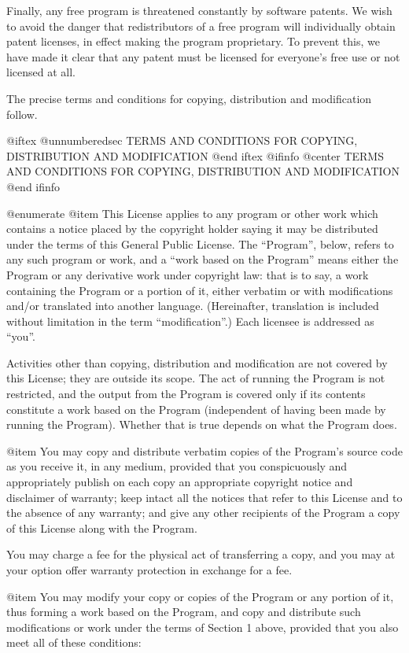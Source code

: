   Finally, any free program is threatened constantly by software
patents.  We wish to avoid the danger that redistributors of a free
program will individually obtain patent licenses, in effect making the
program proprietary.  To prevent this, we have made it clear that any
patent must be licensed for everyone's free use or not licensed at all.

  The precise terms and conditions for copying, distribution and
modification follow.

@iftex
@unnumberedsec TERMS AND CONDITIONS FOR COPYING, DISTRIBUTION AND MODIFICATION
@end iftex
@ifinfo
@center TERMS AND CONDITIONS FOR COPYING, DISTRIBUTION AND MODIFICATION
@end ifinfo

@enumerate
@item
This License applies to any program or other work which contains
a notice placed by the copyright holder saying it may be distributed
under the terms of this General Public License.  The ``Program'', below,
refers to any such program or work, and a ``work based on the Program''
means either the Program or any derivative work under copyright law:
that is to say, a work containing the Program or a portion of it,
either verbatim or with modifications and/or translated into another
language.  (Hereinafter, translation is included without limitation in
the term ``modification''.)  Each licensee is addressed as ``you''.

Activities other than copying, distribution and modification are not
covered by this License; they are outside its scope.  The act of
running the Program is not restricted, and the output from the Program
is covered only if its contents constitute a work based on the
Program (independent of having been made by running the Program).
Whether that is true depends on what the Program does.

@item
You may copy and distribute verbatim copies of the Program's
source code as you receive it, in any medium, provided that you
conspicuously and appropriately publish on each copy an appropriate
copyright notice and disclaimer of warranty; keep intact all the
notices that refer to this License and to the absence of any warranty;
and give any other recipients of the Program a copy of this License
along with the Program.

You may charge a fee for the physical act of transferring a copy, and
you may at your option offer warranty protection in exchange for a fee.

@item
You may modify your copy or copies of the Program or any portion
of it, thus forming a work based on the Program, and copy and
distribute such modifications or work under the terms of Section 1
above, provided that you also meet all of these conditions:

